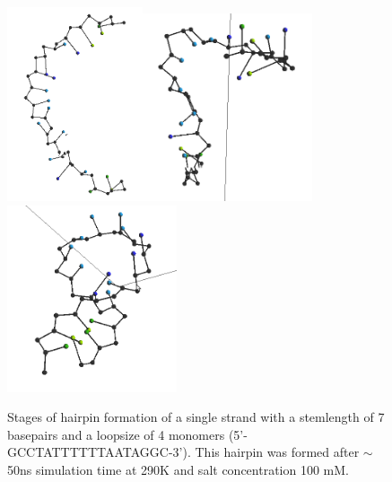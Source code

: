 \begin{figure}[hbt]
\begin{center}
\includegraphics[width=4cm]{images/results_hairpin1}\includegraphics[width=5cm]{images/results_hairpin2}\includegraphics[width=5cm]{images/results_hairpin3}
\end{center}
\caption{Stages of hairpin formation of a single strand with a stemlength of 7 basepairs and a loopsize of 4 monomers (5'-GCCTATTTTTTAATAGGC-3'). This hairpin was formed after $\sim$ 50ns simulation time at 290K and salt concentration 100 mM.}
\label{results_hairpin}
\end{figure}





